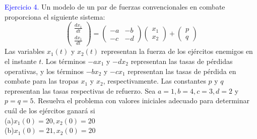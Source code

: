 \justify
\textcolor{blue}{Ejercicio 4.} Un modelo de un par de fuerzas convencionales en combate proporciona el siguiente sistema: 
$$\begin{pmatrix}
\frac{dx_1}{dt}\\
\frac{dx_1}{dt}
\end{pmatrix} = \begin{pmatrix}
-a & -b\\
-c & -d
\end{pmatrix} \begin{pmatrix}
x_1\\
x_2
\end{pmatrix} + \begin{pmatrix}
p\\
q
\end{pmatrix}$$
Las variables $x_1(t)$ y $x_2(t)$ representan la fuerza de los ejércitos enemigos en el instante $t$. Los términos $-ax_1$ y $-dx_2$ representan las tasas de pérdidas operativas, y los términos $-bx_2$ y $-cx_1$ representan las tasas de pérdida en combate para las tropas $x_1$ y $x_2$, respectivamente. Las constantes $p$ y $q$ representan las tasas respectivas de refuerzo. Sea $a=1, b=4, c=3, d=2$ y $p=q=5$. Resuelva el problema con valores iniciales adecuado para determinar cuál de los ejércitos ganará si\\

(a)$x_1(0) = 20, x_2(0) = 20$\\

(b)$x_1(0) = 21, x_2(0) = 20$\\

